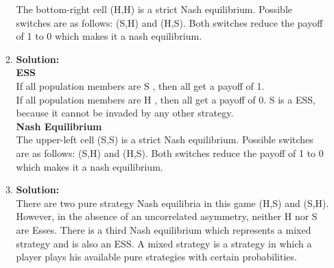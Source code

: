 \documentclass[a4paper]{article}
\begin{document}
\begin{enumerate}
\begin{enumerate}
		The bottom-right cell (H,H) is a strict Nash equilibrium. Possible switches are as follows: (S,H) and (H,S). Both switches reduce the payoff of 1 to 0 which makes it a nash equilibrium.
		\vspace{1em}
		
		
		\item \begin{minipage}[t]{\linewidth}
          \centering
    \end{minipage}
    \vspace{1em}
		\textbf{Solution:}\\
		
		\textbf{ESS}\\
		
		If all population members are S , then all get a payoff of 1.\\
		If all population members are H , then all get a payoff of 0. S is a ESS, because it cannot be invaded by any other strategy.\\
		
		
		\textbf{Nash Equilibrium}\\
		
				The upper-left cell (S,S) is a strict Nash equilibrium. Possible switches are as follows: (S,H) and (H,S). Both switches reduce the payoff of 1 to 0 which makes it a nash equilibrium.\\
		
		
		
		
		\item \begin{minipage}[t]{\linewidth}
          \centering
    \end{minipage}
    \vspace{1em}		
        \textbf{Solution:}\\
        
        
	    There are two pure strategy Nash equilibria in this game (H,S) and (S,H). However, in the absence of an uncorrelated asymmetry, neither H nor S are Esses. There is a third Nash equilibrium which represents a mixed strategy and is also an ESS. A mixed strategy is a strategy in which a player plays his available pure strategies with certain probabilities.\\
	    

\end{enumerate}
\end{enumerate}
\end{document}
